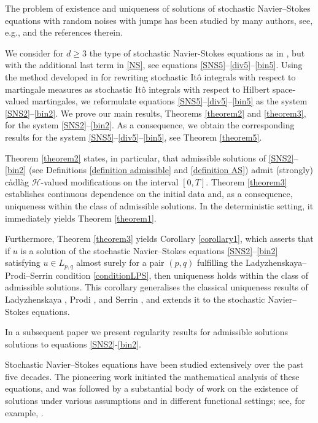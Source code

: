 \documentclass[11pt,reqno]{amsart}
\theoremstyle{definition}
\theoremstyle{remark}
\newcommand\cH{\mathcal{H}}
\newcommand{\<}{\langle}
\renewcommand{\>}{\rangle}
\begin{document}
The problem of existence and uniqueness of solutions of stochastic 
Navier--Stokes equations with random noises with jumps has been 
studied by many authors, see, e.g., \cite {ZBL2019} 
and the references therein. 

We consider for $d\geq3$ the type of stochastic Navier-Stokes equations 
as in \cite{MR2005}, but with the additional last term in \eqref{NS}, see 
equations \eqref{SNS5}--\eqref{div5}--\eqref{bin5}. 
Using the method developed in \cite{KG1980} for rewriting stochastic 
It\^o integrals with respect to martingale measures as stochastic It\^o 
integrals with respect to Hilbert space-valued martingales, we reformulate equations 
\eqref{SNS5}--\eqref{div5}--\eqref{bin5} as the system \eqref{SNS2}--\eqref{bin2}.
We prove our main results, Theorems \ref{theorem2} and \ref{theorem3}, 
for the system \eqref{SNS2}--\eqref{bin2}. As a consequence, 
we obtain the corresponding results for the system 
\eqref{SNS5}--\eqref{div5}--\eqref{bin5},  see Theorem \ref{theorem5}.

Theorem \ref{theorem2} states, in particular, that admissible solutions 
of \eqref{SNS2}--\eqref{bin2} (see Definitions \ref{definition admissible} 
and \ref{definition AS}) admit (strongly) 
c\`adl\`ag $\cH$-valued modifications on the interval $[0,T]$. 
Theorem \ref{theorem3} establishes continuous dependence on the initial 
data and, as a consequence, uniqueness within the class of admissible solutions. 
In the deterministic setting, it immediately yields Theorem \ref{theorem1}.

Furthermore, Theorem \ref{theorem3} yields Corollary \ref{corollary1}, 
which asserts that if $u$ is a solution of the stochastic 
Navier--Stokes equations \eqref{SNS2}--\eqref{bin2} satisfying 
$u\in L_{p,q}$ almost surely for a pair $(p,q)$ fulfilling 
the Ladyzhenskaya--Prodi--Serrin condition \eqref{conditionLPS}, 
then uniqueness holds within the class of admissible solutions. 
This corollary generalises  the classical uniqueness results of Ladyzhenskaya 
\cite{L1967}, Prodi \cite{Prodi1959}, and Serrin \cite{Serrin1963}, 
and extends it to the stochastic Navier--Stokes equations.

In a subsequent paper we present regularity results for admissible solutions 
solutions to  equations \eqref{SNS2}-\eqref{bin2}. 


Stochastic Navier--Stokes equations have been studied extensively 
over the past five decades. The pioneering work \cite{BT1973} 
initiated the mathematical analysis of these equations, 
and was followed by a substantial body of work on the existence 
of solutions under various assumptions and in different functional settings; 
see, for example, \cite{AC1990,CC1991,FY1992,BCF1992,CG1994,B1995,DD2002}.
\end{document}
